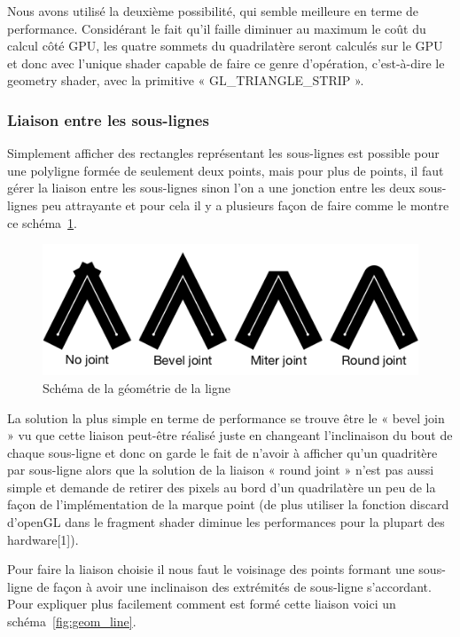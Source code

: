 \documentclass[12pt]{article}
\begin{document}
Nous avons utilisé la deuxième possibilité, qui semble meilleure en terme de performance.
Considérant le fait qu’il faille diminuer au maximum le coût du calcul côté GPU, les quatre sommets du quadrilatère seront calculés sur le GPU et donc avec l’unique shader capable de faire ce genre d’opératio­n, c’est-à-dire le geometry shader, avec la primitive « GL\_TRIANGLE\_STRIP ».

\subsubsection{Liaison entre les sous-lignes}
Simplement afficher des rectangles représentant les sous-lignes est possible pour une polyligne formée de seulement deux points, mais pour plus de points, il faut gérer la liaison entre les sous-lignes sinon l'on a une jonction entre les deux sous-lignes peu attrayante et pour cela il y a plusieurs façon de faire comme le montre ce schéma~\ref{fig:joint}.

\begin{figure}[htp]
  \centering
  \includegraphics[scale=0.8]{images/line-joints}
  \caption{Schéma de la géométrie de la ligne}
  \label{fig:joint}
\end{figure}

La solution la plus simple en terme de performance se trouve être le « bevel join » vu que cette liaison peut-être réalisé juste en changeant l’inclinaison du bout de chaque sous-ligne et donc on garde le fait de n’avoir à afficher qu’un quadritère par sous-ligne alors que la solution de la liaison  « round joint » n’est pas aussi simple et demande de retirer des pixels au bord d’un quadrilatère un peu de la façon de l’implémentation de la marque point (de plus utiliser la fonction discard d’openGL dans le fragment shader diminue les performances pour la plupart des hardware[1]).

Pour faire la liaison choisie il nous faut le voisinage des points formant une sous-ligne de façon à avoir une inclinaison des extrémités de sous-ligne s’accordant. Pour expliquer plus facilement comment est formé cette liaison voici un schéma~\ref{fig:geom_line}.
\end{document}
